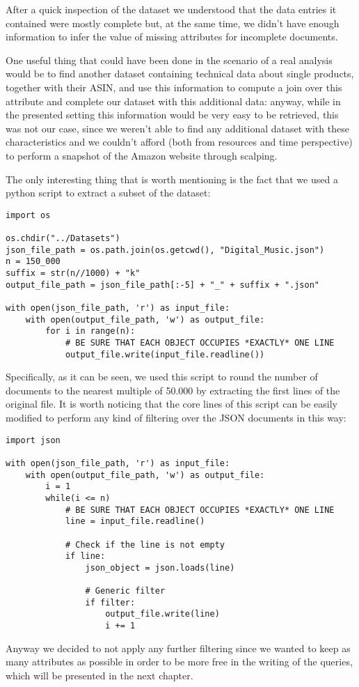 After a quick inspection of the dataset we understood that the data entries it contained were mostly complete but, at the same time, we didn't have enough information to infer the value of missing attributes for incomplete documents.

One useful thing that could have been done in the scenario of a real analysis would be to find another dataset containing technical data about single products, together with their ASIN, and use this information to compute a join over this attribute and complete our dataset with this additional data: anyway, while in the presented setting this information would be very easy to be retrieved, this was not our case, since we weren't able to find any additional dataset with these characteristics and we couldn't afford (both from resources and time perspective) to perform a snapshot of the Amazon website through scalping. 

The only interesting thing that is worth mentioning is the fact that we used a python script to extract a subset of the dataset:\\
\begin{verbatim}
import os

os.chdir("../Datasets")
json_file_path = os.path.join(os.getcwd(), "Digital_Music.json")
n = 150_000
suffix = str(n//1000) + "k"
output_file_path = json_file_path[:-5] + "_" + suffix + ".json"

with open(json_file_path, 'r') as input_file:
    with open(output_file_path, 'w') as output_file:
        for i in range(n):
            # BE SURE THAT EACH OBJECT OCCUPIES *EXACTLY* ONE LINE
            output_file.write(input_file.readline())
\end{verbatim}

Specifically, as it can be seen, we used this script to round the number of documents to the nearest multiple of 50.000 by extracting the first lines of the original file.
It is worth noticing that the core lines of this script can be easily modified to perform any kind of filtering over the JSON documents in this way:\\
\begin{verbatim}
import json

with open(json_file_path, 'r') as input_file:
    with open(output_file_path, 'w') as output_file:
        i = 1
        while(i <= n)
            # BE SURE THAT EACH OBJECT OCCUPIES *EXACTLY* ONE LINE
            line = input_file.readline()

            # Check if the line is not empty
            if line:
                json_object = json.loads(line)

                # Generic filter
                if filter:
                    output_file.write(line)
                    i += 1
\end{verbatim}
Anyway we decided to not apply any further filtering since we wanted to keep as many attributes as possible in order to be more free in the writing of the queries, which will be presented in the next chapter.